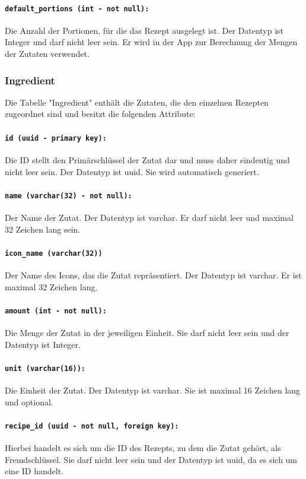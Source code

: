 \documentclass{entwurfsheft}
\begin{document}
\paragraph{\texttt{default\_portions (int - not null):}} Die Anzahl der Portionen, für die das Rezept ausgelegt ist. Der Datentyp ist Integer und darf nicht leer sein. Er wird in der App zur Berechnung der Mengen der Zutaten verwendet.
\newpage
\subsubsection{Ingredient}
Die Tabelle "Ingredient" enthält die Zutaten, die den einzelnen Rezepten zugeordnet sind und besitzt die folgenden Attribute:
\paragraph{\texttt{id (uuid - primary key):}} Die ID stellt den Primärschlüssel der Zutat dar und muss daher eindeutig und nicht leer sein. Der Datentyp ist \Gls{uuid}. Sie wird automatisch generiert.
\paragraph{\texttt{name (varchar(32) - not null):}} Der Name der Zutat. Der Datentyp ist \Gls{varchar}. Er darf nicht leer und maximal 32 Zeichen lang sein.
\paragraph{\texttt{icon\_name (varchar(32))}} Der Name des Icons, das die Zutat repräsentiert. Der Datentyp ist \Gls{varchar}. Er ist maximal 32 Zeichen lang.
\paragraph{\texttt{amount (int - not null):}} Die Menge der Zutat in der jeweiligen Einheit. Sie darf nicht leer sein und der Datentyp ist Integer.
\paragraph{\texttt{unit (varchar(16)):}} Die Einheit der Zutat. Der Datentyp ist \Gls{varchar}. Sie ist maximal 16 Zeichen lang und optional.
\paragraph{\texttt{recipe\_id (uuid - not null, foreign key):}} Hierbei handelt es sich um die ID des Rezepts, zu dem die Zutat gehört, als Fremdschlüssel. Sie darf nicht leer sein und der Datentyp ist \Gls{uuid}, da es sich um eine ID handelt.
\newpage
\end{document}
